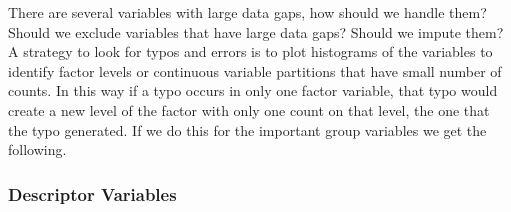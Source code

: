 \documentclass{article}\usepackage[]{graphicx}\usepackage[]{color}
\begin{document}
There are several variables with large data gaps, how should we handle them? Should we exclude variables that have large data gaps? Should we impute them?\\

A strategy to look for typos and errors is to plot histograms of the variables to identify factor levels or continuous variable partitions that have small number of counts. In this way if a typo occurs in only one factor variable, that typo would create a new level of the factor with only one count on that level, the one that the typo generated. If we do this for the important group variables we get the following.\newpage


\subsubsection*{Descriptor Variables} 
\end{document}
